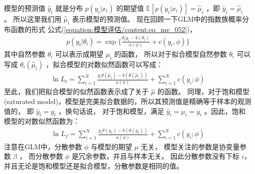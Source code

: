 \documentclass[letterpaper,10pt,english]{sphinxmanual}
\begin{document}
模型的预测值 \(\hat{y}_i\) 就是分布 \(p(y_i|x_i)\) 的期望值
\(\mathbb{E}[p(y_i|x_i)]=\hat{\mu}_i\) ，即 \(\hat{y}_i=\hat{\mu}_i\) 。
所以这里我们用 \(\hat{\mu}_i\) 表示模型的预测值。
现在回顾一下GLM中的指数族概率分布函数的形式 公式(\ref{equation:模型评估/content:eq_me_052})，
\begin{equation}\label{equation:模型评估/content:eq_me_052}
\begin{split}p(y_i|\theta_i) = \exp \{\frac{\theta_i y_i - b(\theta_i)}{a(\phi)} + c(y_i,\phi)\}\end{split}
\end{equation}
其中自然参数 \(\theta_i\) 可以表示成期望 \(\mu_i\) 的函数，
所以对于拟合模型自然参数 \(\theta_i\) 可以写成 \(\theta_i(\hat{\mu}_i)\)
，拟合模型的对数似然函数可以写成：
\begin{equation}\label{equation:模型评估/content:eq_34_51}
\begin{split}\ln L_t =   \sum_{i=1}^N \frac{y_i \theta(\hat{\mu}_i) -b(\theta(\hat{\mu}_i))}{a(\phi)}
+ \sum_{i=1}^N  c(y_i;\phi)\end{split}
\end{equation}
至此，我们把拟合模型的似然函数表示成了关于 \(\hat{\mu}\) 的函数。
同理，对于饱和模型(saturated model)，模型是完美拟合数据的，所以其预测值是精确等于样本的观测值的，
即 \(\hat{y}_i=y_i\) ，换句话说，
对于饱和模型，满足 \(\hat{y}_i=\hat{\mu}_i=y_i\)
。因此，饱和模型的对数似然函数为：
\begin{equation}\label{equation:模型评估/content:eq_34_52}
\begin{split}\ln L_f =   \sum_{i=1}^N \frac{y_i \theta(y_i) -b(\theta(y_i))}{a(\phi)}
+ \sum_{i=1}^N  c(y_i;\phi)\end{split}
\end{equation}
注意在GLM中，分散参数 \(\phi\) 与模型的期望 \(\mu\) 无关，
模型关注的参数是协变量参数 \(\beta\) ，
而分散参数 \(\phi\) 是冗余参数，并且与样本无关。
因此分散参数没有下标 \(i\)，
并且无论是饱和模型还是拟合模型，分散参数是相同的值。
\end{document}
